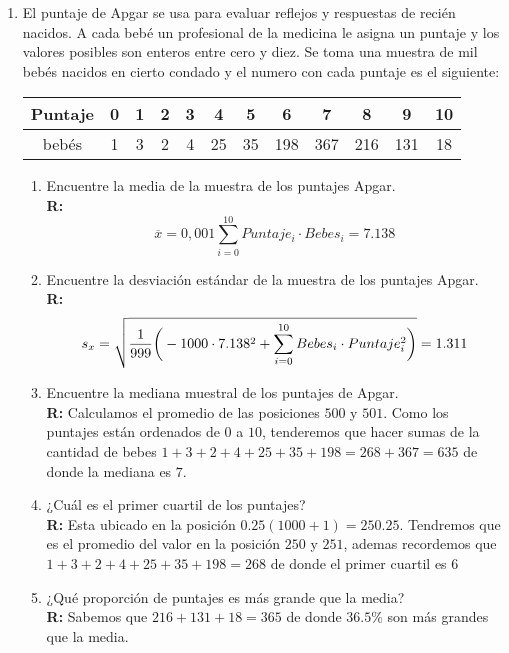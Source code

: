 \documentclass[10pt,a4paper]{book}
\begin{document}
\begin{enumerate}
	\item El puntaje de Apgar se usa para evaluar reflejos y respuestas de recién nacidos. A cada bebé un profesional de la medicina le asigna un puntaje y los valores posibles son enteros entre cero y diez. Se toma una muestra de mil bebés nacidos en cierto condado y el numero con cada puntaje es el siguiente:\\
	
	\begin{tabular}{c|ccccccccccc}
	Puntaje	& 0 & 1 & 2 & 3 & 4 & 5 & 6 & 7 & 8 & 9 & 10 \\ 
		\hline 
	bebés & 1 & 3 & 2 & 4 & 25 & 35 & 198 & 367 & 216 & 131 & 18 \\ 
	\end{tabular} 
	
	\begin{enumerate}
		\item Encuentre la media de la muestra de los puntajes Apgar.\\
		\textbf{R:} $$ \overline{x} = 0,001\sum_{i=0}^{10} Puntaje_i \cdot Bebes_i = 7.138  $$

		\item  Encuentre la desviación estándar de la muestra de los puntajes Apgar.\\
		\textbf{R:} $$ s_x = \sqrt{\frac{1}{999}\bigg{(} - 1000\cdot7.138^2 + \sum_{i=0}^{10} Bebes_i \cdot Puntaje_i^2 \bigg{)} } = 1.311 $$
		
		\item Encuentre la mediana muestral de los puntajes de Apgar.\\
		\textbf{R:} Calculamos el promedio de las posiciones $500$ y $ 501 $. Como los puntajes están ordenados de $ 0 $ a $ 10 $, tenderemos que hacer sumas de la cantidad de bebes $ 1+3+2+4+25+35+198 = 268 + 367 = 635$ de donde la mediana es $ 7 $.
		
		\item  ¿Cuál es el primer cuartil de los puntajes?\\
		\textbf{R:} Esta ubicado en la posición $ 0.25(1000+1) = 250.25 $. Tendremos que es el promedio del valor en la posición $ 250 $ y $ 251 $, ademas recordemos que $ 1+3+2+4+25+35+198 = 268 $ de donde el primer cuartil es $ 6 $
		
		\item ¿Qué proporción de puntajes es más grande que la media?\\
		\textbf{R:} Sabemos que $ 216 +131 +18 = 365$ de donde $ 36.5\% $ son más grandes que la media.
		

\end{enumerate}
\end{enumerate}
\end{document}
